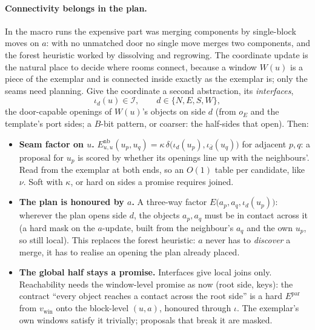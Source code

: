 \documentclass[11pt]{article}
\newcommand{\1}{\mathds{1}}
\begin{document}
\paragraph{Connectivity belongs in the plan.} In the macro runs the expensive
part was merging components by single-block moves on $a$: with no unmatched
door no single move merges two components, and the forest heuristic worked by
dissolving and regrowing. The coordinate update is the natural place to decide
where rooms connect, because a window $W(u)$ is a piece of the exemplar and is
connected inside exactly as the exemplar is; only the seams need planning. Give
the coordinate a second abstraction, its \emph{interfaces},
\[
  \iota_d(u) \in \mathcal I, \qquad d \in \{N, E, S, W\},
\]
the door-capable openings of $W(u)$'s objects on side $d$ (from $o_E$ and the
template's port sides; a $B$-bit pattern, or coarser: the half-sides that open).
Then:
\begin{itemize}
  \item \textbf{Seam factor on $u$.} $E^{\mathrm{nb}}_{u,u}(u_p, u_q) =
        \kappa\, \delta\big(\iota_d(u_p), \iota_{\bar d}(u_q)\big)$ for adjacent $p, q$: a
        proposal for $u_p$ is scored by whether its openings line up with the
        neighbours'. Read from the exemplar at both ends, so an $O(1)$ table
        per candidate, like $\nu$. Soft with $\kappa$, or hard on sides a promise
        requires joined.
  \item \textbf{The plan is honoured by $a$.} A three-way factor
        $E\big(a_p, a_q, \iota_d(u_p)\big)$: wherever the plan opens side $d$, the
        objects $a_p, a_q$ must be in contact across it (a hard mask on the
        $a$-update, built from the neighbour's $a_q$ and the own $u_p$, so still
        local). This replaces the forest heuristic: $a$ never has to \emph{discover}
        a merge, it has to realise an opening the plan already placed.
  \item \textbf{The global half stays a promise.} Interfaces give local joins
        only. Reachability needs the window-level promise as now (root side,
        keys): the contract ``every object reaches a contact across the root
        side'' is a hard $E^{\mathrm{par}}$ from $v_{\text{win}}$ onto the block-level
        $(u, a)$, honoured through $\iota$. The exemplar's own windows satisfy it
        trivially; proposals that break it are masked.
\end{itemize}
\end{document}
